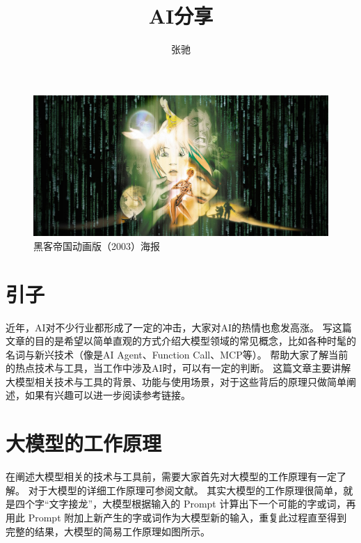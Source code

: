 \documentclass[letterpaper,11pt]{article}
\numberwithin{equation}{section}
\begin{document}
\title{AI分享}
\author{张驰}
\maketitle

\begin{figure}[htbp]
    \centering
    \includegraphics[width=1\textwidth]{../../assets/imgs/ai_share/bg.jpg}
    \caption*{黑客帝国动画版（2003）海报}
\end{figure}

\section{引子}

近年，AI对不少行业都形成了一定的冲击，大家对AI的热情也愈发高涨。
写这篇文章的目的是希望以简单直观的方式介绍大模型领域的常见概念，比如各种时髦的名词与新兴技术（像是AI Agent、Function Call、MCP等）。
帮助大家了解当前的热点技术与工具，当工作中涉及AI时，可以有一定的判断。
这篇文章主要讲解大模型相关技术与工具的背景、功能与使用场景，对于这些背后的原理只做简单阐述，如果有兴趣可以进一步阅读参考链接。

\section{大模型的工作原理}

在阐述大模型相关的技术与工具前，需要大家首先对大模型的工作原理有一定了解。
对于大模型的详细工作原理可参阅文献\cite{alammar2018transformer}。
其实大模型的工作原理很简单，就是四个字“文字接龙”，大模型根据输入的 Prompt 计算出下一个可能的字或词，再用此 Prompt 附加上新产生的字或词作为大模型新的输入，重复此过程直至得到完整的结果，大模型的简易工作原理如图所示。
\end{document}
